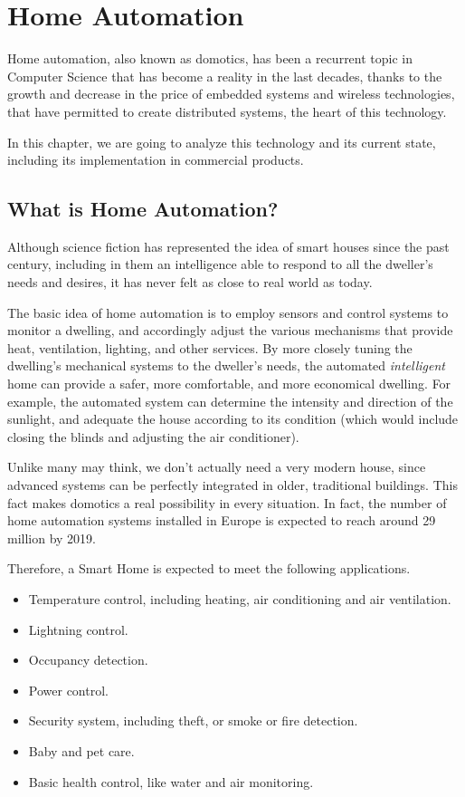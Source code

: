 \chapter{Home Automation}

Home automation, also known as domotics, has been a recurrent topic in Computer Science that
has become a reality in the last decades, thanks to the growth and decrease in the price of embedded
systems and wireless technologies, that have permitted to create distributed systems, the heart of this technology.

In this chapter, we are going to analyze this technology and its current state, including its implementation in commercial
products.

\section{What is Home Automation?}
Although science fiction has represented the idea of smart houses since the past century, including in them
an intelligence able to respond to all the dweller’s needs and desires, it has never felt as close to real world as today.

The basic idea of home automation is to employ sensors and control systems to monitor a dwelling, and accordingly
adjust the various mechanisms that provide heat, ventilation, lighting, and other services. By more closely tuning the
dwelling’s mechanical systems to the dweller’s needs, the automated \textit{intelligent} home can provide a safer, more
comfortable, and more economical dwelling.\cite{smarthouse98} For example, the automated system can determine
the intensity and direction of the sunlight, and adequate the house according to its condition (which would include
closing the blinds and adjusting the air conditioner).

Unlike many may think, we don't actually need a very modern house, since advanced systems can be perfectly integrated
in older, traditional buildings. This fact makes domotics a real possibility in every situation. In fact, the number of home
automation systems installed in Europe is expected to reach around 29 million by 2019.\cite{statistaInstalled}

Therefore, a Smart Home is expected to meet the following applications.
\begin{itemize}
	\item Temperature control, including heating, air conditioning and air ventilation.
	\item Lightning control.
	\item Occupancy detection.
	\item Power control.
	\item Security system, including theft, or smoke or fire detection.
	\item Baby and pet care.
	\item Basic health control, like water and air monitoring.
\end{itemize}

